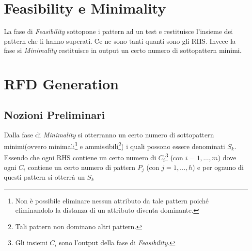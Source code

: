 
\section{Feasibility e Minimality}
La fase di \textit{Feasibility} sottopone i pattern ad un test e restituisce l'insieme dei pattern che li hanno superati. Ce ne sono tanti quanti sono gli RHS. Invece la fase si \textit{Minimality} restituisce in output un certo numero di sottopattern minimi.
\section{RFD Generation}
\subsection{Nozioni Preliminari}
Dalla fase di \textit{Minimality} si otterranno un certo numero di sottopattern minimi(ovvero minimali\footnote{Non è possibile eliminare nessun attributo da tale pattern poiché eliminandolo la distanza di un attributo diventa dominante.} e ammissibili\footnote{Tali pattern non dominano altri pattern.}) i quali possono essere denominati $S_{k}$. Essendo che ogni RHS contiene un certo numero di $C_{i}$\footnote{Gli insiemi $C_{i}$ sono l'output della fase di  \textit{Feasibility}.} (con $i=1,\dots,m$)  dove ogni $C_{i}$ contiene un certo numero di pattern $P_{j}$ (con $j = 1,\dots,h$) e per ognuno di questi pattern si otterrà un $S_{k}$
